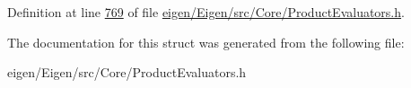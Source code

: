 Definition at line \hyperlink{eigen_2_eigen_2src_2_core_2_product_evaluators_8h_source_l00769}{769} of file \hyperlink{eigen_2_eigen_2src_2_core_2_product_evaluators_8h_source}{eigen/\+Eigen/src/\+Core/\+Product\+Evaluators.\+h}.



The documentation for this struct was generated from the following file\+:\begin{DoxyCompactItemize}
\item 
eigen/\+Eigen/src/\+Core/\+Product\+Evaluators.\+h\end{DoxyCompactItemize}
